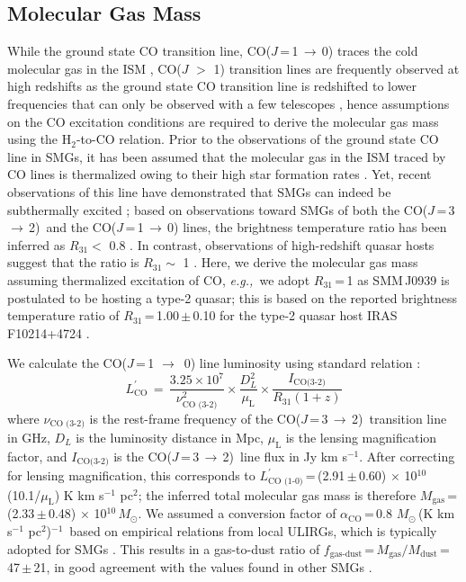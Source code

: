 \documentclass[twocolumn,apj,numberedappendix]{emulateapj}
\newcommand{\Msun}{\mbox{$M_{\odot}$}}
\newcommand{\rarr}{$\rightarrow$}
\newcommand{\CO}{\mbox{CO($J$\,=\,3\,$\rightarrow$\,2) }}
\newcommand{\LpU}{\mbox{K\,\,km\,\,s$^{-1}$\,\,pc$^2$}}
\newcommand{\eg}{{\sl e.g.,~}}
\newcommand{\pmOne}{\mbox{$^{-1}$}}
\begin{document}
\subsection{Molecular Gas Mass}
While the ground state CO transition line, CO($J$\,=\,1\,\rarr\,0) traces the cold molecular gas in the ISM
\citep*[\eg][]{Wilson70a,Downes98a}, CO($J$ $>$ 1) transition lines are frequently observed at high redshifts as the
 ground state CO transition line is redshifted to lower frequencies that can only be observed with a few telescopes 
 \citep{Carilli13a}, 
 hence assumptions on the CO excitation conditions are required to derive the molecular gas mass using the H$_\textrm{2}$-to-CO 
 relation. 
Prior to the observations of the ground state CO line in SMGs, it has been assumed that the molecular gas in the
  ISM traced by CO lines is thermalized owing to their high star formation rates \citep[\eg][]{Greve05a, Coppin08a}.
   Yet, recent observations of this line have demonstrated that SMGs can indeed be subthermally excited
   \citep{Harris10a,Riechers11c,Riechers11d,Ivison11a}; based on observations toward SMGs of both the \CO and the CO($J$\,=\,1\,\rarr\,0) lines, the 
   brightness temperature ratio has been inferred as $R_\textrm{31}<$ 0.8 \citep
   {Harris10a,Carilli10a,Swinbank2010a,Riechers11d,Ivison11a,Ivison10d}. In contrast, observations of high-redshift quasar hosts suggest that the ratio 
   is $R_\textrm{31}\sim$ 1 \citep{Riechers06a, Riechers11a, Scott11a}. 
Here, we derive the molecular gas mass 
assuming thermalized excitation of CO, 
\eg we adopt $R_\textrm{31}$\,=\,1 as SMM\,J0939 is 
postulated to be hosting a type-2 quasar; this is based on the reported brightness temperature ratio of $R_\textrm{31}$\,=\,1.00\,$\pm$\,0.10 for the type-2 quasar host IRAS F10214+4724 \citep[hereafter F10214; ][]{Riechers11a}.
\par
We calculate the CO($J$\,=\,1 \rarr\ 0) line luminosity using standard relation 
\citep[\eg][]{Solomon05a,Carilli13a}:
\begin{equation}
L^{\prime}_\textrm{CO}\,=\,\frac{3.25\times10^7}{\nu_\textrm{CO (3-2)}^2}\times \frac{D_L^2}{\mu_\textrm{L}} \times
\frac{I_\textrm{CO(3-2)}} {R_\textrm{31} (1 + z)}
\end{equation}
where $\nu_\textrm{CO (3-2)}$ is the rest-frame frequency of the \CO transition line in GHz, $D_L$ is the luminosity distance in Mpc, $\mu_\textrm{L}$ is the lensing magnification factor, and $I_\textrm{CO(3-2)}$ is the \CO line flux in Jy\,\,km\,\,s\pmOne. After correcting for lensing magnification, this corresponds to $L^{\prime}_\textrm{CO (1-0)}$\,=\,(2.91\,$\pm$\,0.60)\,\,$\times$\,\,10$^{10}$\,(10.1/$\mu_\textrm{L}$)\,\,\LpU; the inferred total molecular gas mass is therefore $M_\textrm{gas}$\,=\,(2.33\,$\pm$\,0.48)\,\,$\times$\,\,10$^{10}$\,\Msun. We assumed a conversion factor of $\alpha_\textrm{CO}$\,=\,0.8\,\,\Msun\,(\LpU)\pmOne\ based on empirical relations from local ULIRGs, which is typically
adopted for SMGs \citep[\eg][]{Tacconi06a,Tacconi08a,Bothwell13a}. 
This results in a gas-to-dust
ratio of $f_\textrm{gas-dust}$\,=\,$M_\textrm{gas}/M_\textrm{dust}$\,=\,47\,$\pm$\,21, in good agreement with the 
values found in other SMGs \citep{Coppin08a,Micha10a,Riechers11c}.
\end{document}
